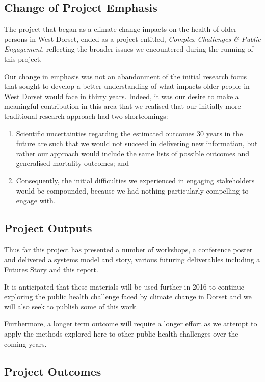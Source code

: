 \subsection{Change of Project Emphasis}
The project that began as a climate change impacts on the health of older persons in West Dorset, ended as a project entitled, \emph{Complex Challenges \& Public Engagement}, reflecting the broader issues we encountered during the running of this project.

Our change in emphasis was not an abandonment of the initial research focus that sought to develop a better understanding of what impacts older people in West Dorset would face in thirty years. Indeed, it was our desire to make a meaningful contribution in this area that we realised that our initially more traditional research approach had two shortcomings:
\begin{enumerate}
	\item Scientific uncertainties regarding the estimated outcomes 30 years in the future are such that we would not succeed in delivering new information, but rather our approach would include the same lists of possible outcomes and generalised mortality outcomes; and
	\item Consequently, the initial difficulties we experienced in engaging stakeholders would be compounded, because we had nothing particularly compelling to engage with.
\end{enumerate}

\subsection{Project Outputs}
Thus far this project has presented a number of workshops, a conference poster and delivered a systems model and story, various futuring deliverables including a Futures Story and this report.

It is anticipated that these materials will be used further in 2016 to continue exploring the public health challenge faced by climate change in Dorset and we will also seek to publish some of this work.

Furthermore, a longer term outcome will require a longer effort as we attempt to apply the methods explored here to other public health challenges over the coming years.

\subsection{Project Outcomes}

